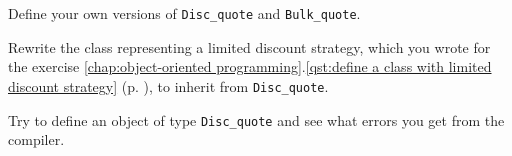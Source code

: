 %
%
\begin{question}
Define your own versions of \verb|Disc_quote| and \verb|Bulk_quote|.
\end{question}

\begin{question}
Rewrite the class representing a limited discount strategy,
which you wrote for the exercise \ref{chap:object-oriented programming}.\ref{qst:define a class  with limited discount strategy} (p. \pageref{qst:define a class  with limited discount strategy}), to inherit from \verb|Disc_quote|.
\end{question}

\begin{question}
Try to define an object of type \verb|Disc_quote| and see what
errors you get from the compiler.
\end{question}
